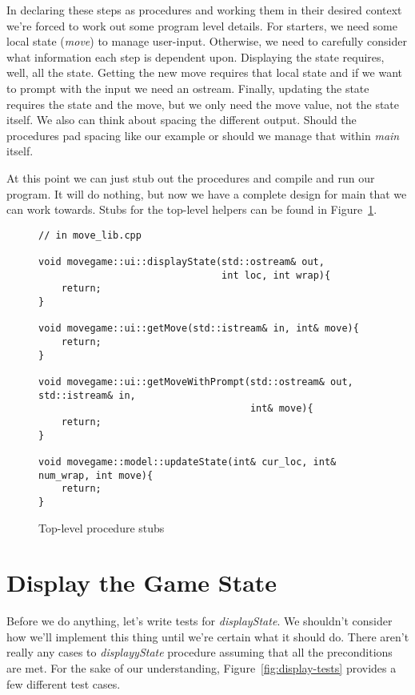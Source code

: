 \documentclass[nobib]{tufte-handout}
\begin{document}
In declaring these steps as procedures and working them in their desired context we're forced to work out some program level details. For starters, we need some local state (\textit{move}) to manage user-input. Otherwise, we need to carefully consider what information each step is dependent upon. Displaying the state requires, well, all the state. Getting the new move requires that local state and if we want to prompt with the input we need an ostream. Finally, updating the state requires the state and the move, but we only need the move value, not the state itself. We also can think about spacing the different output. Should the procedures pad spacing like our example or should we manage that within \textit{main} itself.

At this point we can just stub out the procedures and compile and run our program. It will do nothing, but now we have a complete design for main that we can work towards. Stubs for the top-level helpers can be found in Figure~\ref{fig:top-stubs}.

\begin{figure}[!htbp]
\begin{lstlisting}
// in move_lib.cpp

void movegame::ui::displayState(std::ostream& out,
	                            int loc, int wrap){
	return;
}

void movegame::ui::getMove(std::istream& in, int& move){
	return;
}

void movegame::ui::getMoveWithPrompt(std::ostream& out, std::istream& in,
								     int& move){
	return;
}

void movegame::model::updateState(int& cur_loc, int& num_wrap, int move){
	return;
}
\end{lstlisting}
\caption{Top-level procedure stubs}
\label{fig:top-stubs}
\end{figure}

\section{Display the Game State}

Before we do anything, let's write tests for \textit{displayState}. We shouldn't consider how we'll implement this thing until we're certain what it should do. There aren't really any cases to \textit{displayyState} procedure assuming that all the preconditions are met.  For the sake of our understanding, Figure~\ref{fig:display-tests} provides a few different test cases.
\end{document}
